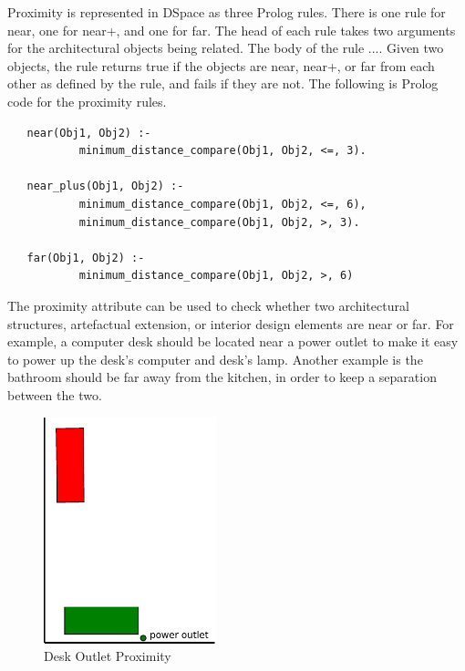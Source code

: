 \documentclass[12pt]{ucthesis}
\begin{document}
Proximity is represented in DSpace as three Prolog rules. There is one rule for near, one for near+, and one for far. The head of each rule takes two arguments for the architectural objects being related. The body of the rule .... Given two objects, the rule returns true if the objects are near, near+, or far from each other as defined by the rule, and fails if they are not. The following is Prolog code for the proximity rules.

\begin{verbatim}
   near(Obj1, Obj2) :- 
           minimum_distance_compare(Obj1, Obj2, <=, 3).
   
   near_plus(Obj1, Obj2) :-
           minimum_distance_compare(Obj1, Obj2, <=, 6),
           minimum_distance_compare(Obj1, Obj2, >, 3).   
   
   far(Obj1, Obj2) :- 
           minimum_distance_compare(Obj1, Obj2, >, 6)

\end{verbatim}

The proximity attribute can be used to check whether two architectural structures, artefactual extension, or interior design elements are near or far. For example, a computer desk should be located near a power outlet to make it easy to power up the desk's computer and desk's lamp. Another example is the bathroom should be far away from the kitchen, in order to keep a separation between the two.

\begin{figure}[H]
 \centering
 \includegraphics[width=50mm]{desk-proximity}
 \caption{Desk Outlet Proximity}
\label{desk-proximity}
\end{figure}
\end{document}
